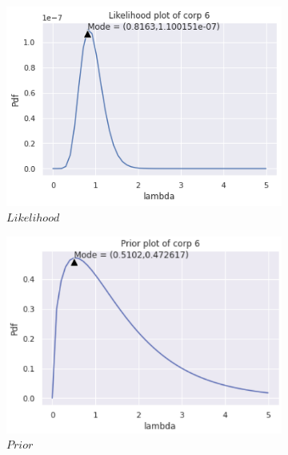 \documentclass[english,a4paper,12pt]{article}
\begin{document}
\begin{enumerate}
\begin{itemize}
 {\begin{figure}[h!]
     \centering
     \begin{subfigure}[b]{0.3\textwidth}
         \centering
         \includegraphics[width=\textwidth]{pictures/Q3/Likelihood_C6.png}
         \caption{$Likelihood$}
         \label{Likelihood}
     \end{subfigure}
     \hfill
     \begin{subfigure}[b]{0.3\textwidth}
         \centering
         \includegraphics[width=\textwidth]{pictures/Q3/Prior_C6.png}
         \caption{$Prior$}
         \label{Prior}
     \end{subfigure}
     \hfill
     \begin{subfigure}[b]{0.3\textwidth}
         \centering

\end{subfigure}
\end{figure}}
\end{itemize}
\end{enumerate}
\end{document}
